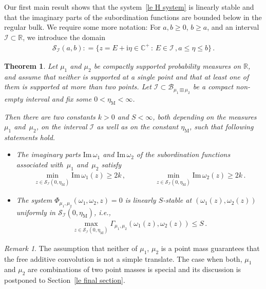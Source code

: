 \documentclass[10pt,reqno]{amsart}
\numberwithin{equation}{section}
\theoremstyle{plain}
\newtheorem{theorem}{Theorem}[section]
\newcounter{kevin}
\numberwithin{kevin}{section}
\theoremstyle{remark}
\newtheorem{remark}[kevin]{Remark}
\newcommand{\im}{\mathrm{Im}\,}
\newcommand{\R}{{\mathbb R }}
\newcommand{\C}{{\mathbb C}}
\newcommand{\ii}{\mathrm{i}}
\newcommand{\deq}{\mathrel{\mathop:}=}
\newcommand{\ie}{\emph{i.e., }}
\newcommand{\PP}{\Phi}
\begin{document}
Our first main result shows that the system~\eqref{le H system} is linearly stable and that the imaginary parts of the subordination functions are bounded below in the regular bulk. We require some more notation: For $a,b\ge 0$, $b\ge a$, and an interval $\mathcal{I}\subset \R$, we introduce the domain
\begin{align}\label{le domain S}
 \mathcal{S}_{\mathcal{I}}(a,b)\deq \{z=E+\ii\eta\in\C^+\,:\,E\in \mathcal{I}\,,  a\le \eta\le b\}\,.
\end{align}



\begin{theorem} \label{thm stability}
Let $\mu_1$ and $\mu_2$ be compactly supported probability measures on $\R$, and assume that neither is supported at a single point and that at least one of them is supported at more than two points. Let $\mathcal{I}\subset\mathcal{B}_{\mu_1\boxplus\mu_2}$ be a compact non-empty interval and fix some $0<\eta_{\mathrm{M}}<\infty$. 

Then there are two constants $k>0$ and $S<\infty$, both depending on the measures~$\mu_1$ and~$\mu_2$, on the interval $\mathcal{I}$ as well as on the constant $\eta_{\mathrm{M}}$, such that following statements hold.
\begin{itemize}[noitemsep,topsep=0pt,partopsep=0pt,parsep=0pt]
\item[$(i)$] The imaginary parts $\im \omega_1$ and $\im \omega_2$ of the subordination functions associated with~$\mu_1$ and~$\mu_2$ satisfy
\begin{align}\label{le thm lower bound on omega equation}
  \min_{z\in \mathcal{S}_{\mathcal{I}}(0,\eta_{\mathrm{M}})}\im \omega_1(z)\ge 2k\,,\qquad\qquad \min_{z\in \mathcal{S}_{\mathcal{I}}(0,\eta_{\mathrm{M}})}\im \omega_2(z)\ge 2k\,.
\end{align}
\item[$(ii)$] The system $\PP_{\mu_1,\mu_2}(\omega_1,\omega_2,z)=0$ is linearly $S$-stable at $(\omega_1(z),\omega_2(z))$ uniformly in $\mathcal{S}_{\mathcal{I}}(0,\eta_{\mathrm{M}})$, \ie
\begin{align}\label{le thm linear stability equation}
\max_{z\in\mathcal{S}_{\mathcal{I}}(0,\eta_{\mathrm{M}})}\Gamma_{\mu_1,\mu_2}(\omega_1(z),\omega_2(z))\le S\,.
\end{align}
\end{itemize}
\end{theorem}
\begin{remark}
 The assumption that neither of $\mu_1$, $\mu_2$ is a point mass guarantees that the free additive convolution is not a simple translate.  The case when both, $\mu_1$ and $\mu_2$ are combinations of two point masses is special and its discussion is postponed to Section~\ref{le final section}.
\end{remark}
\end{document}
